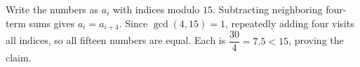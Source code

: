 Write the numbers as $a_i$ with indices modulo $15$. Subtracting neighboring four-term sums gives $a_i=a_{i+4}$. Since $\gcd(4,15)=1$, repeatedly adding four visits all indices, so all fifteen numbers are equal. Each is $\dfrac{30}{4}=7.5<15$, proving the claim.
